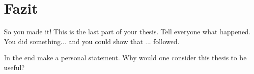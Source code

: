 \chapter{Fazit}\label{chapter:conclusion}
So you made it!
This is the last part of your thesis.
Tell everyone what happened.
You did something... and you could show that ... followed.

In the end make a personal statement.
Why would one consider this thesis to be useful?


